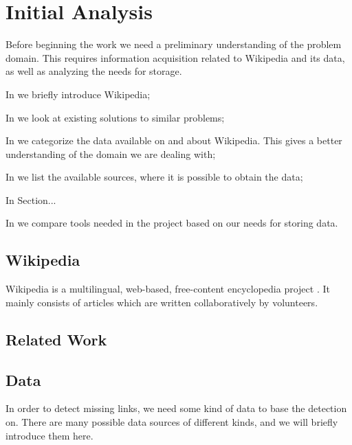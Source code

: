 \chapter{Initial Analysis}\label{chap:analysis}
Before beginning the work we need a preliminary understanding of the problem domain. This requires information acquisition related to Wikipedia and its data, as well as analyzing the needs for storage.

\begin{chapterorganization}
  \item In  we briefly introduce Wikipedia;
  \item In  we look at existing solutions to similar problems;
  \item In  we categorize the data available on and about Wikipedia. This gives a better understanding of the domain we are dealing with;
  \item In  we list the available sources, where it is possible to obtain the data;
  \item In Section...
  \item In  we compare tools needed in the project based on our needs for storing data.
\end{chapterorganization}

\section{Wikipedia}\label{sec:about_wikipedia}
Wikipedia is a multilingual, web-based, free-content encyclopedia project \cite{wiki-about}. It mainly consists of articles which are written collaboratively by volunteers. 

\section{Related Work}\label{sec:related_work}
\dummy

\section{Data}\label{sec:data}
In order to detect missing links, we need some kind of data to base the detection on. There are many possible data sources of different kinds, and we will briefly introduce them here.


